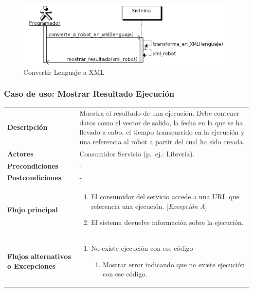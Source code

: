 \begin{figure}[bp!]
  \includegraphics[width=1\textwidth]{chapters/technical-manual/diagrams/sequence/convertir_lenguaje_a_xml.png}
\caption{Convertir Lenguaje a XML}
\end{figure}
\clearpage

\subsubsection{\large{Caso de uso: Mostrar Resultado Ejecución}}
\label{mostrar_resultado_ejecucion_servicio}
\begin{tabular}[h]{ p{ } p{ }}

\textbf{Descripción} & Muestra el resultado de una ejecución. Debe
contener datos como el vector de salida, la fecha en la que se ha
llevado a cabo, el tiempo transcurrido en la ejecución y una
referencia al robot a partir del cual ha sido creada.\\[3mm]

\textbf{Actores} & Consumidor Servicio (p.~ej.: Librería).\\[3mm]

\textbf{Precondiciones} & - \\[3mm]

\textbf{Postcondiciones} & - \\[3mm]

\textbf{Flujo principal} & \begin{enumerate}[leftmargin=1em,topsep=0pt, partopsep=0pt]
  \item El consumidor del servicio accede a una URL que referencia una
    ejecución. [\emph{Excepción A}]
  \item El sistema devuelve información sobre la ejecución.
\end{enumerate}\\[3mm]

\textbf{Flujos alternativos o Excepciones} &
\begin{enumerate}[label=\Alph*:,leftmargin=1em,topsep=0pt, partopsep=0pt]
\item No existe ejecución con ese código
  \begin{enumerate}[label=\arabic*.,topsep=0pt, partopsep=0pt]
    \item Mostrar error indicando que no existe ejecución con ese
      código.
  \end{enumerate}
\end{enumerate}\\[3mm]
\end{tabular}

